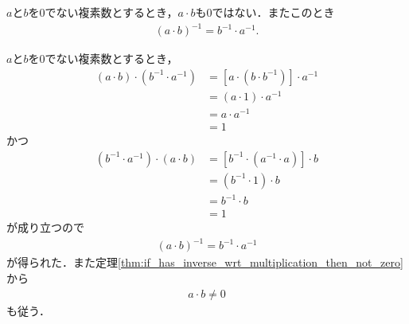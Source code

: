 	\begin{screen}
		\begin{thm}[$0$でない数同士の積は乗法に関して逆元を持つ]
		\label{thm:C_has_no_zero_divisor}
			$a$と$b$を$0$でない複素数とするとき，$a \cdot b$も$0$ではない．またこのとき
			\begin{align}
				(a \cdot b)^{-1} = b^{-1} \cdot a^{-1}.
			\end{align}
		\end{thm}
	\end{screen}
	
	\begin{sketch}
		$a$と$b$を$0$でない複素数とするとき，
		\begin{align}
			(a \cdot b) \cdot (b^{-1} \cdot a^{-1})
			&= \left[a \cdot (b \cdot b^{-1})\right] \cdot a^{-1} \\
			&= (a \cdot 1) \cdot a^{-1} \\
			&= a \cdot a^{-1} \\
			&= 1
		\end{align}
		かつ
		\begin{align}
			(b^{-1} \cdot a^{-1}) \cdot (a \cdot b) 
			&= \left[b^{-1} \cdot (a^{-1} \cdot a)\right] \cdot b \\
			&= (b^{-1} \cdot 1) \cdot b \\
			&= b^{-1} \cdot b \\
			&= 1
		\end{align}
		が成り立つので
		\begin{align}
			(a \cdot b)^{-1} = b^{-1} \cdot a^{-1}
		\end{align}
		が得られた．また定理\ref{thm:if_has_inverse_wrt_multiplication_then_not_zero}から
		\begin{align}
			a \cdot b \neq 0
		\end{align}
		も従う．
		\QED
	\end{sketch}
	
